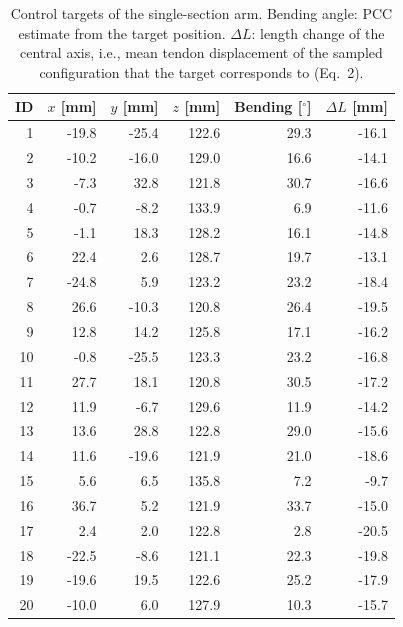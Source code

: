 \begin{table}[h]
\centering
\caption{Control targets of the single-section arm. Bending angle: PCC estimate from the target position. $\Delta L$: length change of the central axis, i.e., mean tendon displacement of the sampled configuration that the target corresponds to (Eq.~2).}
\label{tab:S8_targets_single}
\begin{tabular}{rrrrrr}
\toprule
ID & $x$ [mm] & $y$ [mm] & $z$ [mm] & Bending [$^\circ$] & $\Delta L$ [mm] \\
\midrule
1 & -19.8 & -25.4 & 122.6 & 29.3 & -16.1 \\
2 & -10.2 & -16.0 & 129.0 & 16.6 & -14.1 \\
3 & -7.3 & 32.8 & 121.8 & 30.7 & -16.6 \\
4 & -0.7 & -8.2 & 133.9 & 6.9 & -11.6 \\
5 & -1.1 & 18.3 & 128.2 & 16.1 & -14.8 \\
6 & 22.4 & 2.6 & 128.7 & 19.7 & -13.1 \\
7 & -24.8 & 5.9 & 123.2 & 23.2 & -18.4 \\
8 & 26.6 & -10.3 & 120.8 & 26.4 & -19.5 \\
9 & 12.8 & 14.2 & 125.8 & 17.1 & -16.2 \\
10 & -0.8 & -25.5 & 123.3 & 23.2 & -16.8 \\
11 & 27.7 & 18.1 & 120.8 & 30.5 & -17.2 \\
12 & 11.9 & -6.7 & 129.6 & 11.9 & -14.2 \\
13 & 13.6 & 28.8 & 122.8 & 29.0 & -15.6 \\
14 & 11.6 & -19.6 & 121.9 & 21.0 & -18.6 \\
15 & 5.6 & 6.5 & 135.8 & 7.2 & -9.7 \\
16 & 36.7 & 5.2 & 121.9 & 33.7 & -15.0 \\
17 & 2.4 & 2.0 & 122.8 & 2.8 & -20.5 \\
18 & -22.5 & -8.6 & 121.1 & 22.3 & -19.8 \\
19 & -19.6 & 19.5 & 122.6 & 25.2 & -17.9 \\
20 & -10.0 & 6.0 & 127.9 & 10.3 & -15.7 \\
\bottomrule
\end{tabular}
\end{table}

